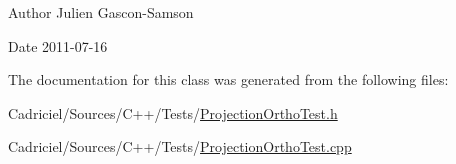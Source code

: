 \begin{DoxyAuthor}{Author}
Julien Gascon-\/\-Samson 
\end{DoxyAuthor}
\begin{DoxyDate}{Date}
2011-\/07-\/16 
\end{DoxyDate}


The documentation for this class was generated from the following files\-:\begin{DoxyCompactItemize}
\item 
Cadriciel/\-Sources/\-C++/\-Tests/\hyperlink{_projection_ortho_test_8h}{Projection\-Ortho\-Test.\-h}\item 
Cadriciel/\-Sources/\-C++/\-Tests/\hyperlink{_projection_ortho_test_8cpp}{Projection\-Ortho\-Test.\-cpp}\end{DoxyCompactItemize}
